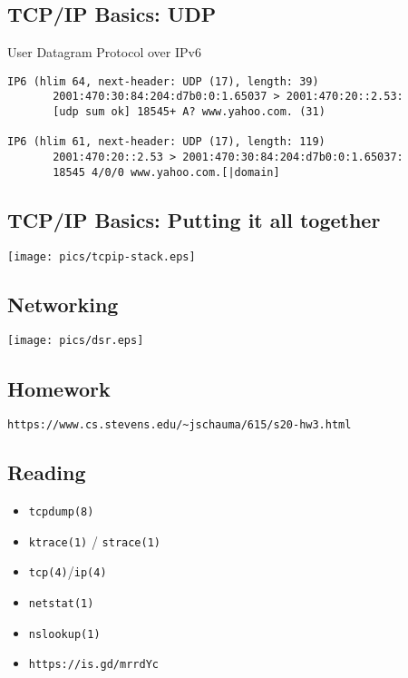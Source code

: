\documentclass[xga]{xdvislides}
\begin{document}
\subsection{TCP/IP Basics: UDP}
\begin{center}
User Datagram Protocol over IPv6
\end{center}
\vspace{.2in}
\begin{verbatim}
IP6 (hlim 64, next-header: UDP (17), length: 39)
       2001:470:30:84:204:d7b0:0:1.65037 > 2001:470:20::2.53:
       [udp sum ok] 18545+ A? www.yahoo.com. (31)

IP6 (hlim 61, next-header: UDP (17), length: 119)
       2001:470:20::2.53 > 2001:470:30:84:204:d7b0:0:1.65037:
       18545 4/0/0 www.yahoo.com.[|domain]

\end{verbatim}

\subsection{TCP/IP Basics: Putting it all together}
\vspace*{\fill}
\begin{center}
	\texttt{[image: pics/tcpip-stack.eps]}
\end{center}
\vspace*{\fill}

\subsection{Networking}
\vspace*{\fill}
\begin{center}
	\texttt{[image: pics/dsr.eps]} \\
\end{center}
\vspace*{\fill}

\subsection{Homework}

\verb+https://www.cs.stevens.edu/~jschauma/615/s20-hw3.html+

\subsection{Reading}
\begin{itemize}
	\item \verb+tcpdump(8)+
	\item \verb+ktrace(1)+ / \verb+strace(1)+
	\item \verb+tcp(4)+/\verb+ip(4)+
	\item \verb+netstat(1)+
	\item \verb+nslookup(1)+
\end{itemize}
\vspace{.5in}
\begin{itemize}
	\item \verb+https://is.gd/mrrdYc+
\end{itemize}
\end{document}
